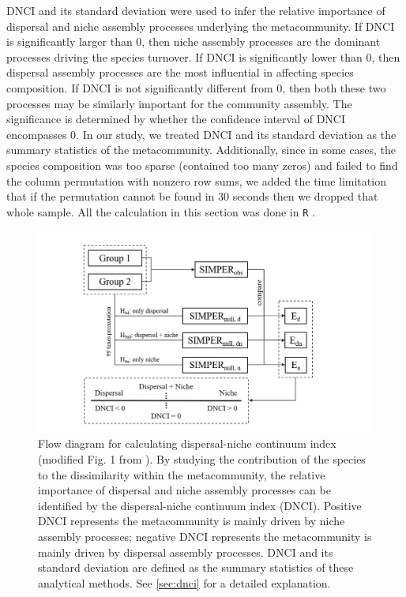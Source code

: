 DNCI and its standard deviation were used to infer the relative importance of dispersal and niche assembly processes underlying the metacommunity. If DNCI is significantly larger than 0, then niche assembly processes are the dominant processes driving the species turnover. If DNCI is significantly lower than 0, then dispersal assembly processes are the most influential in affecting species composition. If DNCI is not significantly different from 0, then both these two processes may be similarly important for the community assembly. The significance is determined by whether the confidence interval of DNCI encompasses 0. In our study, we treated DNCI and its standard deviation as the summary statistics of the metacommunity. Additionally, since in some cases, the species composition was too sparse (contained too many zeros) and failed to find the column permutation with nonzero row sums, we added the time limitation that if the permutation cannot be found in 30 seconds then we dropped that whole sample. All the calculation in this section was done in \texttt{R} \citep{R}.


\begin{figure}
	\centering
	\includegraphics[width=\linewidth]{./figures/ppt/DNCI.png}
	\caption[Flow diagram for calculating dispersal-niche continuum index.]{\small
		Flow diagram for calculating dispersal-niche continuum index (modified Fig. 1 from \citet{vilmi2021dispersal}). By studying the contribution of the species to the dissimilarity within the metacommunity, the relative importance of dispersal and niche assembly processes can be identified by the dispersal-niche continuum index (DNCI). Positive DNCI represents the metacommunity is mainly driven by niche assembly processes; negative DNCI represents the metacommunity is mainly driven by dispersal assembly processes. DNCI and its standard deviation are defined as the summary statistics of these analytical methods. See \autoref{sec:dnci} for a detailed explanation.}
	\label{fig:DNCI}
\end{figure}

